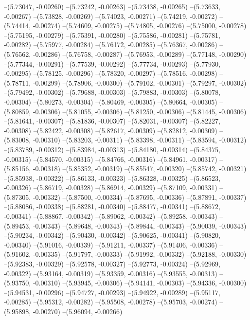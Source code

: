 --(5.73047, -0.00260)
--(5.73242, -0.00263)
--(5.73438, -0.00265)
--(5.73633, -0.00267)
--(5.73828, -0.00269)
--(5.74023, -0.00271)
--(5.74219, -0.00272)
--(5.74414, -0.00274)
--(5.74609, -0.00275)
--(5.74805, -0.00276)
--(5.75000, -0.00278)
--(5.75195, -0.00279)
--(5.75391, -0.00280)
--(5.75586, -0.00281)
--(5.75781, -0.00282)
--(5.75977, -0.00284)
--(5.76172, -0.00285)
--(5.76367, -0.00286)
--(5.76562, -0.00286)
--(5.76758, -0.00287)
--(5.76953, -0.00289)
--(5.77148, -0.00290)
--(5.77344, -0.00291)
--(5.77539, -0.00292)
--(5.77734, -0.00293)
--(5.77930, -0.00295)
--(5.78125, -0.00296)
--(5.78320, -0.00297)
--(5.78516, -0.00298)
--(5.78711, -0.00299)
--(5.78906, -0.00300)
--(5.79102, -0.00301)
--(5.79297, -0.00302)
--(5.79492, -0.00302)
--(5.79688, -0.00303)
--(5.79883, -0.00303)
--(5.80078, -0.00304)
--(5.80273, -0.00304)
--(5.80469, -0.00305)
--(5.80664, -0.00305)
--(5.80859, -0.00306)
--(5.81055, -0.00306)
--(5.81250, -0.00306)
--(5.81445, -0.00306)
--(5.81641, -0.00307)
--(5.81836, -0.00307)
--(5.82031, -0.00307)
--(5.82227, -0.00308)
--(5.82422, -0.00308)
--(5.82617, -0.00309)
--(5.82812, -0.00309)
--(5.83008, -0.00310)
--(5.83203, -0.00311)
--(5.83398, -0.00311)
--(5.83594, -0.00312)
--(5.83789, -0.00312)
--(5.83984, -0.00313)
--(5.84180, -0.00314)
--(5.84375, -0.00315)
--(5.84570, -0.00315)
--(5.84766, -0.00316)
--(5.84961, -0.00317)
--(5.85156, -0.00318)
--(5.85352, -0.00319)
--(5.85547, -0.00320)
--(5.85742, -0.00321)
--(5.85938, -0.00322)
--(5.86133, -0.00323)
--(5.86328, -0.00325)
--(5.86523, -0.00326)
--(5.86719, -0.00328)
--(5.86914, -0.00329)
--(5.87109, -0.00331)
--(5.87305, -0.00332)
--(5.87500, -0.00334)
--(5.87695, -0.00336)
--(5.87891, -0.00337)
--(5.88086, -0.00338)
--(5.88281, -0.00340)
--(5.88477, -0.00341)
--(5.88672, -0.00341)
--(5.88867, -0.00342)
--(5.89062, -0.00342)
--(5.89258, -0.00343)
--(5.89453, -0.00343)
--(5.89648, -0.00343)
--(5.89844, -0.00343)
--(5.90039, -0.00343)
--(5.90234, -0.00342)
--(5.90430, -0.00342)
--(5.90625, -0.00341)
--(5.90820, -0.00340)
--(5.91016, -0.00339)
--(5.91211, -0.00337)
--(5.91406, -0.00336)
--(5.91602, -0.00335)
--(5.91797, -0.00333)
--(5.91992, -0.00332)
--(5.92188, -0.00330)
--(5.92383, -0.00329)
--(5.92578, -0.00327)
--(5.92773, -0.00324)
--(5.92969, -0.00322)
--(5.93164, -0.00319)
--(5.93359, -0.00316)
--(5.93555, -0.00313)
--(5.93750, -0.00310)
--(5.93945, -0.00306)
--(5.94141, -0.00303)
--(5.94336, -0.00300)
--(5.94531, -0.00296)
--(5.94727, -0.00293)
--(5.94922, -0.00289)
--(5.95117, -0.00285)
--(5.95312, -0.00282)
--(5.95508, -0.00278)
--(5.95703, -0.00274)
--(5.95898, -0.00270)
--(5.96094, -0.00266)

